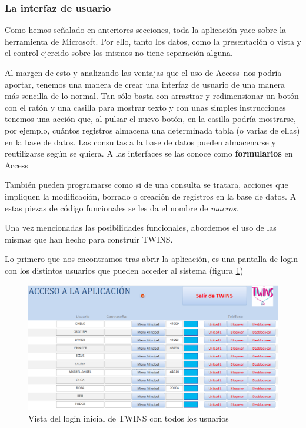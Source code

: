\subsubsection{La interfaz de usuario}

Como hemos señalado en anteriores secciones, toda la aplicación yace sobre la herramienta de Microsoft\textregistered. Por ello, tanto los datos, como la presentación o vista y el control ejercido sobre los mismos no tiene separación alguna.

Al margen de esto y analizando las ventajas que el uso de Access\textregistered \ nos podría aportar, tenemos una manera de crear una interfaz de usuario de una manera más sencilla de lo normal. Tan sólo basta con arrastrar y redimensionar un botón con el ratón y una casilla para mostrar texto y con unas simples instrucciones tenemos una acción que, al pulsar el nuevo botón, en la casilla podría mostrarse, por ejemplo, cuántos registros almacena una determinada tabla (o varias de ellas) en la base de datos. Las consultas a la base de datos pueden almacenarse y reutilizarse según se quiera. A las interfaces se las conoce como \textbf{formularios} en Access\textregistered

También pueden programarse como si de una consulta se tratara, acciones que impliquen la modificación, borrado o creación de registros en la base de datos. A estas piezas de código funcionales se les da el nombre de \textit{macros}.

Una vez mencionadas las posibilidades funcionales, abordemos el uso de las mismas que han hecho para construir TWINS.

Lo primero que nos encontramos tras abrir la aplicación, es una pantalla de login con los distintos usuarios que pueden acceder al sistema (figura \ref{fig:login})

\begin{figure}
	\includegraphics[width=\textwidth]{img/Capturas de TWINS/login.png}
	\caption[Login de TWINS]{Vista del login inicial de TWINS con todos los usuarios}
	\label{fig:login}
\end{figure}


